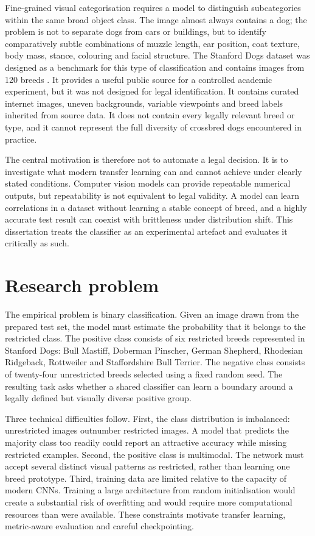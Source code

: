 Fine-grained visual categorisation requires a model to distinguish subcategories within the same broad object class. The image almost always contains a dog; the problem is not to separate dogs from cars or buildings, but to identify comparatively subtle combinations of muzzle length, ear position, coat texture, body mass, stance, colouring and facial structure. The Stanford Dogs dataset was designed as a benchmark for this type of classification and contains images from 120 breeds \citep{khosla2011novel,stanforddogs}. It provides a useful public source for a controlled academic experiment, but it was not designed for legal identification. It contains curated internet images, uneven backgrounds, variable viewpoints and breed labels inherited from source data. It does not contain every legally relevant breed or type, and it cannot represent the full diversity of crossbred dogs encountered in practice.

The central motivation is therefore not to automate a legal decision. It is to investigate what modern transfer learning can and cannot achieve under clearly stated conditions. Computer vision models can provide repeatable numerical outputs, but repeatability is not equivalent to legal validity. A model can learn correlations in a dataset without learning a stable concept of breed, and a highly accurate test result can coexist with brittleness under distribution shift. This dissertation treats the classifier as an experimental artefact and evaluates it critically as such.

\section{Research problem}
The empirical problem is binary classification. Given an image drawn from the prepared test set, the model must estimate the probability that it belongs to the restricted class. The positive class consists of six restricted breeds represented in Stanford Dogs: Bull Mastiff, Doberman Pinscher, German Shepherd, Rhodesian Ridgeback, Rottweiler and Staffordshire Bull Terrier. The negative class consists of twenty-four unrestricted breeds selected using a fixed random seed. The resulting task asks whether a shared classifier can learn a boundary around a legally defined but visually diverse positive group.

Three technical difficulties follow. First, the class distribution is imbalanced: unrestricted images outnumber restricted images. A model that predicts the majority class too readily could report an attractive accuracy while missing restricted examples. Second, the positive class is multimodal. The network must accept several distinct visual patterns as restricted, rather than learning one breed prototype. Third, training data are limited relative to the capacity of modern CNNs. Training a large architecture from random initialisation would create a substantial risk of overfitting and would require more computational resources than were available. These constraints motivate transfer learning, metric-aware evaluation and careful checkpointing.


